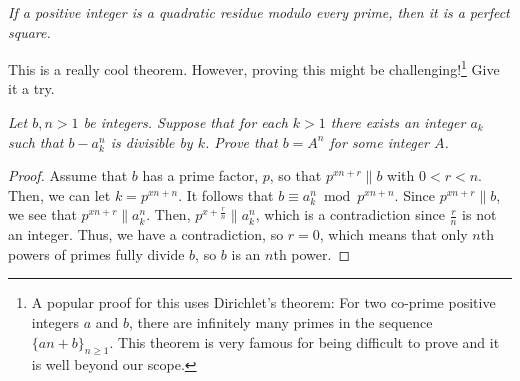 \documentclass[main.tex]{subfile}
\begin{document}
		\begin{theorem}\slshape
			If a positive integer is a quadratic residue modulo every prime, then it is a perfect square. 
		\end{theorem}
	This is a really cool theorem. However, proving this might be challenging!\footnote{A popular proof for this uses Dirichlet's theorem: For two co-prime positive integers $a$ and $b$, there are infinitely many primes in the sequence $\{an+b\}_{n\geq1}$. This theorem is very famous for being difficult to prove and it is well beyond our scope.} Give it a try.
		\begin{theorem}\slshape
			Let $b,n > 1$ be integers. Suppose that for each $k > 1$ there exists an integer $a_k$ such that $b - a^n_k$ is divisible by $k$. Prove that $b = A^n$ for some integer $A$.
		\end{theorem}
		
		\begin{proof}
			Assume that $ b$ has a prime factor, $ p$, so that $ p^{xn + r}\|b$ with $ 0 < r < n$. Then, we can let $ k = p^{xn + n}$. It follows that $ b\equiv a_k^n\bmod p^{xn + n}$. Since $ p^{xn + r}\|b$, we see that $ p^{xn + r}\|a_k^n$. Then, $ p^{x + \frac {r}{n}}\|a_k^n$, which is a contradiction since $ \frac {r}{n}$ is not an integer. Thus, we have a contradiction, so $ r = 0$, which means that only $ n$th powers of primes fully divide $ b$, so $ b$ is an $ n$th power.
		\end{proof}
		

	
\end{document}

